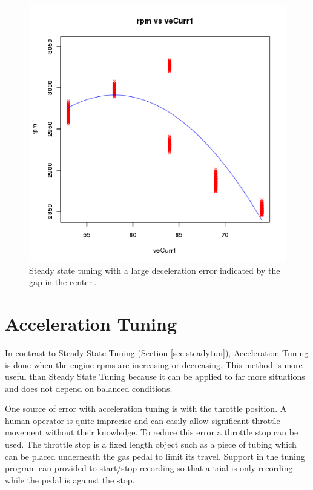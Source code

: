 \documentclass{article}
\begin{document}
\begin{figure}[tbp]
\center
\includegraphics[scale=0.5]{plotdata-veTable1-20110613-15:17:10.png}
\caption{Steady state tuning with a large deceleration error
indicated by the gap in the center..}
\label{fig:ssrerr}
\end{figure}


\section{Acceleration Tuning}
\label{sec:acctun}

In contrast to Steady State Tuning (Section \ref{sec:steadytun}), Acceleration
Tuning is done when the engine rpms are increasing or decreasing.
This method is more useful than Steady State Tuning because it can be
applied to far more situations and does not depend on balanced conditions.

One source of error with acceleration tuning is with the throttle position.
A human operator is quite imprecise and can easily allow significant
throttle movement without their knowledge.
To reduce this error a throttle stop can be used.
The throttle stop is a fixed length object such as a piece of tubing which
can be placed underneath the gas pedal to limit its travel.
Support in the tuning program can provided to start/stop recording so
that a trial is only recording while the pedal is against the stop.
\end{document}
